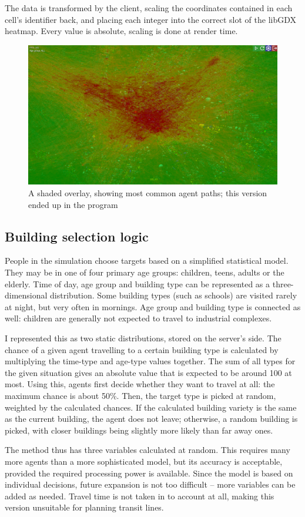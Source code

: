 The data is transformed by the client, scaling the coordinates contained in each cell's identifier back, and placing each integer into the correct slot of the libGDX heatmap. Every value is absolute, scaling is done at render time.
\begin{figure}[h]
    \centering
    \includegraphics[width=140mm, keepaspectratio]{images/overlay_v3.png}
    \caption{A shaded overlay, showing most common agent paths; this version ended up in the program\ \label{overlay_v3}}
\end{figure}

\subsection{Building selection logic}

People in the simulation choose targets based on a simplified statistical model. They may be in one of four primary age groups: children, teens, adults or the elderly. Time of day, age group and building type can be represented as a three-dimensional distribution. Some building types (such as schools) are visited rarely at night, but very often in mornings. Age group and building type is connected as well: children are generally not expected to travel to industrial complexes. 

I represented this as two static distributions, stored on the server's side. The chance of a given agent travelling to a certain building type is calculated by multiplying the time-type and age-type values together. The sum of all types for the given situation gives an absolute value that is expected to be around 100 at most. Using this, agents first decide whether they want to travel at all: the maximum chance is about 50\%. Then, the target type is picked at random, weighted by the calculated chances. If the calculated building variety is the same as the current building, the agent does not leave; otherwise, a random building is picked, with closer buildings being slightly more likely than far away ones.

The method thus has three variables calculated at random. This requires many more agents than a more sophisticated model, but its accuracy is acceptable, provided the required processing power is available. Since the model is based on individual decisions, future expansion is not too difficult -- more variables can be added as needed. Travel time is not taken in to account at all, making this version unsuitable for planning transit lines.